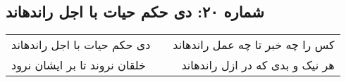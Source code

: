 \begin{center}
\section*{شماره ۲۰: دی حکم حیات با اجل راندهاند}
\label{sec:020}
\begin{longtable}{l p{0.5cm} r}
دی حکم حیات با اجل راندهاند
&&
کس را چه خبر تا چه عمل راندهاند
\\
خلقان نروند تا بر ایشان نرود
&&
هر نیک و بدی که در ازل راندهاند
\\
\end{longtable}
\end{center}
